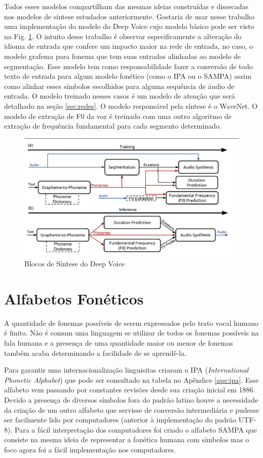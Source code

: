 Todos esses modelos compartilham das mesmas ideias construídas e dissecadas nos modelos de síntese estudados anteriormente. Gostaria de usar nesse trabalho uma implementação do modelo do Deep Voice cujo modelo básico pode ser visto na Fig. \ref{fig:deep_voice_blocks}. O intuito desse trabalho é observar especificamente a alteração do idioma de entrada que confere um impacto maior na rede de entrada, no caso, o modelo grafema para fonema que tem suas entradas alinhadas ao modelo de segmentação. Esse modelo tem como responsabilidade fazer a conversão de todo texto de entrada para algum modelo fonético (como o IPA ou o SAMPA) assim como alinhar esses símbolos escolhidos para alguma sequência de áudio de entrada. O modelo treinado nesses casos é um modelo de atenção que será detalhado na seção \ref{sec:redes}. O modelo responsável pela síntese é o WaveNet. O modelo de extração de F0 da voz é treinado com uma outro algoritmo de extração de frequência fundamental para cada segmento determinado.


\begin{figure}
    \centering
    \includegraphics[width=\textwidth]{figuras/blocos.png}
    \caption{Blocos de Síntese do Deep Voice}
    \label{fig:deep_voice_blocks}
\end{figure}


\section{Alfabetos Fonéticos}
A quantidade de fonemas possíveis de serem expressados pelo trato vocal humano é finito. Não é comum uma linguagem se utilizar de todos os fonemas possíveis na fala humana e a presença de uma quantidade maior ou menor de fonemas também acaba determinando a facilidade de se aprendê-la.

Para garantir uma internacionalização linguisitas criaram o IPA (\textit{International Phonetic Alphabet}) que pode ser consultado na tabela no Apêndice \ref{ape:ipa}. Esse alfabeto vem passando por constantes revisões desde sua criação inicial em 1886. Devido a presença de diversos símbolos fora do padrão latino houve a necessidade da criação de um outro alfabeto que servisse de conversão intermediária e pudesse ser facilmente lido por computadores (anterior à implementação do padrão UTF-8). Para a fácil interpretação dos computadores foi criado o alfabeto SAMPA que consiste na mesma ideia de representar a fonética humana com símbolos mas o foco agora foi a fácil implementação nos computadores.

